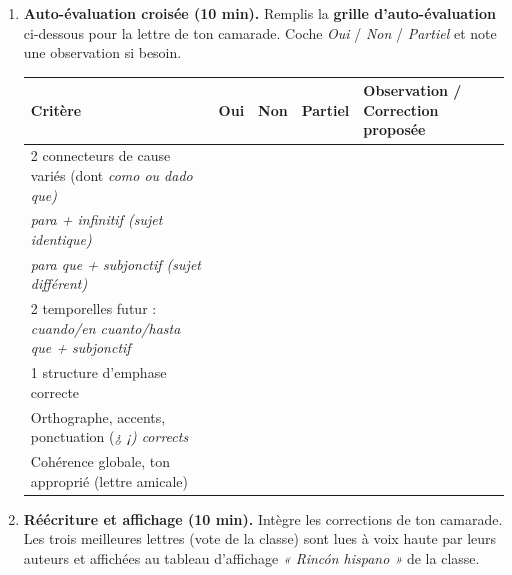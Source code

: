\documentclass[11pt]{article}
\newcommand{\esp}[1]{\ifmmode\text{\textit{#1}}\else\begingroup\selectlanguage{spanish}\itshape #1\endgroup\fi}
\begin{document}
\begin{enumerate}
    \item \textbf{Auto-évaluation croisée (10 min).} Remplis la \textbf{grille d'auto-évaluation} ci-dessous pour la lettre de ton camarade. Coche \emph{Oui} / \emph{Non} / \emph{Partiel} et note une observation si besoin.
    \begin{center}
    \begin{tabularx}{\linewidth}{|X|c|c|c|X|}
    \hline
    \rowcolor{popblueL} \textbf{Critère} & \textbf{Oui} & \textbf{Non} & \textbf{Partiel} & \textbf{Observation / Correction proposée} \\
    \hline
    2 connecteurs de cause variés (dont \esp{como} ou \esp{dado que}) & & & & \\
    \hline
    \esp{para} + infinitif (sujet identique) & & & & \\
    \hline
    \esp{para que} + subjonctif (sujet différent) & & & & \\
    \hline
    2 temporelles futur : \esp{cuando/en cuanto/hasta que} + subjonctif & & & & \\
    \hline
    1 structure d'emphase correcte & & & & \\
    \hline
    Orthographe, accents, ponctuation (\esp{¿ ¡}) corrects & & & & \\
    \hline
    Cohérence globale, ton approprié (lettre amicale) & & & & \\
    \hline
    \end{tabularx}
    \end{center}
    \item \textbf{Réécriture et affichage (10 min).} Intègre les corrections de ton camarade. Les trois meilleures lettres (vote de la classe) sont lues à voix haute par leurs auteurs et affichées au tableau d'affichage \emph{« Rincón hispano »} de la classe.
\end{enumerate}
\end{document}
